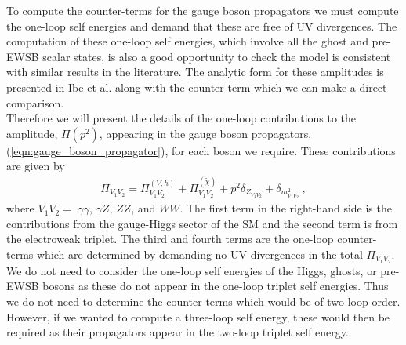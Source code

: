 \documentclass[11pt]{article}
\begin{document}
To compute the counter-terms for the gauge boson propagators we must compute the one-loop self energies and demand that these are free of UV divergences.  The computation of these one-loop self energies, which involve all the ghost and pre-EWSB scalar states, is also a good opportunity to check the model is consistent with similar results in the literature.  The analytic form for these amplitudes is presented in Ibe et al. \cite{Ibe2013a} along with the counter-term which we can make a direct comparison.\\

Therefore we will present the details of the one-loop contributions to the amplitude, $\Pi(p^2)$, appearing in the gauge boson propagators, (\ref{eqn:gauge_boson_propagator}), for each boson we require.  These contributions are given by
{\small
\begin{eqnarray}
\Pi_{V_1 V_2}
= \Pi_{V_1 V_2}^{(V, h)}
+ \Pi_{V_1 V_2}^{(\tilde{\chi})}
+ p^2 \delta_{Z_{V_1 V_2}}
+ \delta_{m^2_{V_1 V_2}}\ ,
\end{eqnarray}
}where $V_1 V_2 =$ $\gamma \gamma$, $\gamma Z$, $ZZ$, and $WW$. The first term in the right-hand side is the contributions from the gauge-Higgs sector of the SM and the second term is from the electroweak triplet.  The third and fourth terms are the one-loop counter-terms which are determined by demanding no UV divergences in the total $\Pi_{V_1 V_2}$.\\

We do not need to consider the one-loop self energies of the Higgs, ghosts, or pre-EWSB bosons as these do not appear in the one-loop triplet self energies.  Thus we do not need to determine the counter-terms which would be of two-loop order.  However, if we wanted to compute a three-loop self energy, these would then be required as their propagators appear in the two-loop triplet self energy.
\end{document}
